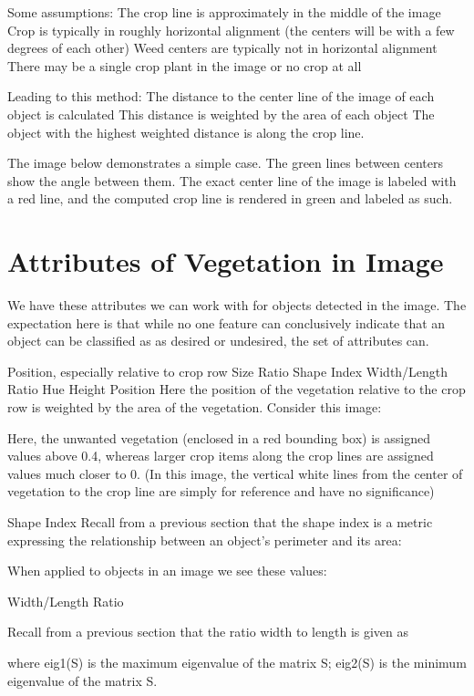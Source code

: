 \documentclass[letterpaper]{article}
\begin{document}
Some assumptions:
The crop line is approximately in the middle of the image
Crop is typically in roughly horizontal alignment (the centers will be with a few degrees of each other)
Weed centers are typically not in horizontal alignment
There may be a single crop plant in the image or no crop at all

Leading to this method:
The distance to the center line of the image of each object is calculated
This distance is weighted by the area of each object
The object with the highest weighted distance is along the crop line.

The image below demonstrates a simple case. The green lines between centers show the angle between them. The exact center line of the image is labeled with a red line, and the computed crop line is rendered in green and labeled as such.


\section{Attributes of Vegetation in Image}
We have these attributes we can work with for objects detected in the image. The expectation here is that while no one feature can conclusively indicate that an object can be classified as as desired or undesired, the set of attributes can.

Position, especially relative to crop row
Size Ratio
Shape Index
Width/Length Ratio
Hue
Height
Position
Here the position of the vegetation relative to the crop row is weighted by the area of the vegetation. Consider this image:



Here, the unwanted vegetation (enclosed in a red bounding box) is assigned values above 0.4, whereas larger crop items along the crop lines are assigned values much closer to 0. (In this image, the vertical white lines from the center of vegetation to the crop line are simply for reference and have no significance)

Shape Index
Recall from a previous section that the shape index is a metric expressing the relationship between an object’s perimeter and its area:

When applied to objects in an image we see these values:



Width/Length Ratio

Recall from a previous section that the ratio width to length is given as




where eig1(S) is the maximum eigenvalue of the matrix S; eig2(S) is the minimum eigenvalue of the matrix S.
\end{document}
